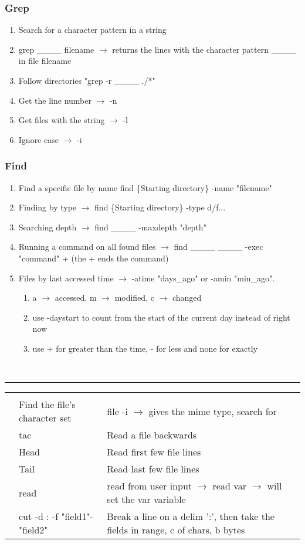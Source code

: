 \documentclass[11pt, noindent]{article}
\newcommand{\ra}{$\rightarrow$ {}}
\newcommand{\blank}{\_\_\_\_{} }
\newcounter{questionSec}
\newcounter{questionCount}[questionSec]
\newcommand{\qItem}[2]{\stepcounter{questionCount} \textbf{\thequestionCount} & #1 & #2\\}
\newenvironment{questions}[1]{\bgroup
	\centering{\large\textbf{#1}}\\
	\vspace{2pt}\hrule\vspace{12pt}

	\newenvironment{questionAnswer}{
		\begin{tabular}{|r| p{.35\textwidth}|p{.55\textwidth}|}
		\hline\hline
		&&\\
		\stepcounter{questionSec}
	}{\hline\end{tabular}\vspace{11pt}}
}{\egroup}
\begin{document}
	\subsubsection{Grep}
		\begin{enumerate}
			\item Search for a character pattern in a string
			\item grep \blank filename \ra returns the lines with the character pattern \blank in file filename
			\item Follow directories "grep -r \blank ./*"
			\item Get the line number \ra -n
			\item Get files with the string \ra -l
			\item Ignore case \ra -i
		\end{enumerate}

	\subsubsection{Find}
		\begin{enumerate}
			\item Find a specific file by name find \{Starting directory\} -name "filename"
			\item Finding by type \ra find \{Starting directory\} -type d/f...
			\item Searching depth \ra find \blank -maxdepth "depth"
			\item Running a command on all found files \ra find \blank \blank -exec "command" {} + (the + ends the command)
			\item Files by last accessed time \ra -atime "days\_ago" or -amin "min\_ago".
			\begin{enumerate}
				\item a \ra accessed, m \ra modified, c \ra changed
				\item use -daystart to count from the start of the current day instead of right now
				\item use + for greater than the time, - for less and none for exactly
			\end{enumerate}
		\end{enumerate}

	\begin{questions}{file}
		\begin{questionAnswer}
			\qItem{Find the file's character set}{file -i \ra gives the mime type, search for}
			\qItem{tac}{Read a file backwards}
			\qItem{Head}{Read first few file lines}
			\qItem{Tail}{Read last few file lines}
			\qItem{read}{read from user input \ra read var \ra will set the var variable}
			\qItem{cut -d : -f "field1"-"field2"}{Break a line on a delim ':', then take the fields in range, c of chars, b bytes}
		\end{questionAnswer}
	\end{questions}
\end{document}
